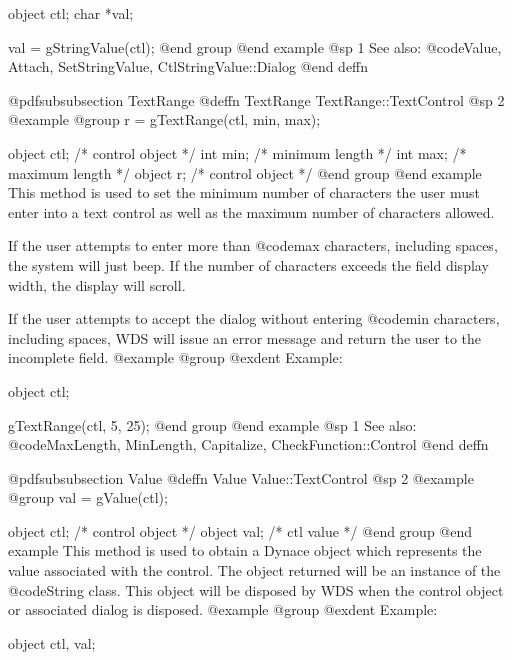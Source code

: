 object  ctl;
char    *val;

val = gStringValue(ctl);
@end group
@end example
@sp 1
See also:  @code{Value, Attach, SetStringValue, CtlStringValue::Dialog}
@end deffn














@pdfsubsubsection {TextRange}
@deffn {TextRange} TextRange::TextControl
@sp 2
@example
@group
r = gTextRange(ctl, min, max);

object  ctl;   /*  control object  */
int     min;   /*  minimum length  */
int     max;   /*  maximum length  */
object  r;     /*  control object  */
@end group
@end example
This method is used to set the minimum number of characters the user must
enter into a text control as well as the maximum number of characters
allowed.

If the user attempts to enter more than @code{max} characters, including
spaces, the system will just beep.  If the number of characters exceeds
the field display width, the display will scroll.

If the user attempts to accept the dialog without entering @code{min}
characters, including spaces, WDS will issue an error message and return
the user to the incomplete field.
@example
@group
@exdent Example:

object  ctl;

gTextRange(ctl, 5, 25);
@end group
@end example
@sp 1
See also:  @code{MaxLength, MinLength, Capitalize, CheckFunction::Control}
@end deffn











@pdfsubsubsection {Value}
@deffn {Value} Value::TextControl
@sp 2
@example
@group
val = gValue(ctl);

object  ctl;   /*  control object  */
object  val;   /*  ctl value       */
@end group
@end example
This method is used to obtain a Dynace object which represents the value
associated with the control.  The object returned will be an instance of
the @code{String} class.  This object will be disposed by WDS when the
control object or associated dialog is disposed.
@example
@group
@exdent Example:

object  ctl, val;

